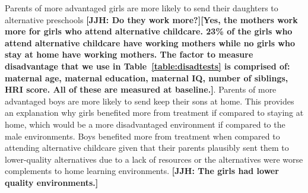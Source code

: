 Parents of more advantaged girls are more likely to send their daughters to alternative preschools \textbf{[JJH: Do they work more?][Yes, the mothers work more for girls who attend alternative childcare. 23\% of the girls who attend alternative childcare have working mothers while no girls who stay at home have working mothers. The factor to measure disadvantage that we use in Table~\ref{table:disadtests} is comprised of: maternal age, maternal education, maternal IQ, number of siblings, HRI score. All of these are measured at baseline.]}. Parents of more advantaged boys are more likely to send keep their sons at home. This provides an explanation why girls benefited more from treatment if compared to staying at home, which would be a more disadvantaged environment if compared to the male environments. Boys benefited more from treatment when compared to attending alternative childcare given that their parents plausibly sent them to lower-quality alternatives due to a lack of resources or the alternatives were worse complements to home learning environments. \textbf{[JJH: The girls had lower quality environments.]}











